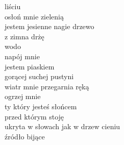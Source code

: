 \begin{text}
    liściu\\
    osłoń mnie zielenią\\
    jestem jesienne nagie drzewo\\
    z zimna drżę\\
    wodo\\
    napój mnie\\
    jestem piaskiem\\
    gorącej suchej pustyni\\
    wiatr mnie przegarnia ręką\\
    ogrzej mnie\\
    ty który jesteś słońcem\\
    przed którym stoję\\
    ukryta w słowach jak w drzew cieniu\\
    źródło bijące
\end{text}
\begin{chord}

\end{chord}